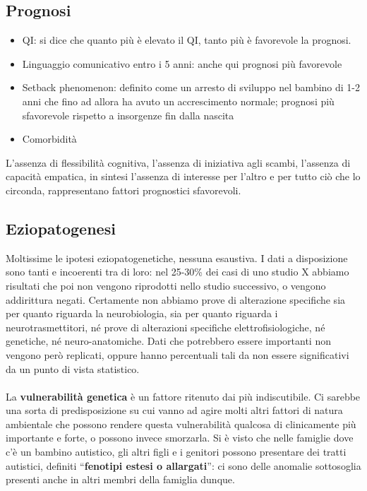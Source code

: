 \subsection{Prognosi}

\begin{itemize}
\item
  QI: si dice che quanto più è elevato il QI, tanto più è favorevole la
  prognosi.
\item
  Linguaggio comunicativo entro i 5 anni: anche qui prognosi più
  favorevole
\item
  Setback phenomenon: definito come un arresto di sviluppo nel bambino
  di 1-2 anni che fino ad allora ha avuto un accrescimento normale;
  prognosi più sfavorevole rispetto a insorgenze fin dalla nascita
\item
  Comorbidità
\end{itemize}

L'assenza di flessibilità cognitiva, l'assenza di iniziativa agli
scambi, l'assenza di capacità empatica, in sintesi l'assenza di
interesse per l'altro e per tutto ciò che lo circonda, rappresentano
fattori prognostici sfavorevoli.

\subsection{Eziopatogenesi}

Moltissime le ipotesi eziopatogenetiche, nessuna esaustiva. I dati a
disposizione sono tanti e incoerenti tra di loro: nel 25-30\% dei casi
di uno studio X abbiamo risultati che poi non vengono riprodotti nello
studio successivo, o vengono addirittura negati. Certamente non abbiamo
prove di alterazione specifiche sia per quanto riguarda la
neurobiologia, sia per quanto riguarda i neurotrasmettitori, né prove di
alterazioni specifiche elettrofisiologiche, né genetiche, né
neuro-anatomiche. Dati che potrebbero essere importanti non vengono però
replicati, oppure hanno percentuali tali da non essere significativi da
un punto di vista statistico.
\\\\
La \textbf{vulnerabilità genetica} è un fattore ritenuto dai più
indiscutibile. Ci sarebbe una sorta di predisposizione su cui vanno ad
agire molti altri fattori di natura ambientale che possono rendere
questa vulnerabilità qualcosa di clinicamente più importante e forte, o
possono invece smorzarla. Si è visto che nelle famiglie dove c'è un
bambino autistico, gli altri figli e i genitori possono presentare dei
tratti autistici, definiti ``\textbf{fenotipi estesi o allargati}'': ci
sono delle anomalie sottosoglia presenti anche in altri membri della
famiglia dunque.

